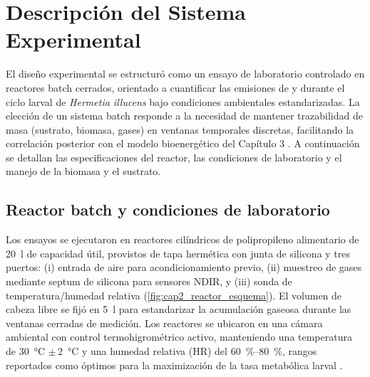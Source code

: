 
\section{Descripción del Sistema Experimental}
\label{sec:cap2_sistema_experimental}

El diseño experimental se estructuró como un ensayo de laboratorio controlado en reactores batch cerrados, orientado a cuantificar las emisiones de  y  durante el ciclo larval de \textit{Hermetia illucens} bajo condiciones ambientales estandarizadas. La elección de un sistema batch responde a la necesidad de mantener trazabilidad de masa (sustrato, biomasa, gases) en ventanas temporales discretas, facilitando la correlación posterior con el modelo bioenergético del Capítulo 3 \parencite{eriksenDynamicModellingFeed2022, padmanabhaComprehensiveDynamicGrowth2020}. A continuación se detallan las especificaciones del reactor, las condiciones de laboratorio y el manejo de la biomasa y el sustrato.

\subsection{Reactor batch y condiciones de laboratorio}
\label{subsec:cap2_reactor}

Los ensayos se ejecutaron en reactores cilíndricos de polipropileno alimentario de \SI{20}{\litre} de capacidad útil, provistos de tapa hermética con junta de silicona y tres puertos: (i) entrada de aire para acondicionamiento previo, (ii) muestreo de gases mediante septum de silicona para sensores NDIR, y (iii) sonda de temperatura/humedad relativa (\cref{fig:cap2_reactor_esquema}). El volumen de cabeza libre se fijó en \SI{5}{\litre} para estandarizar la acumulación gaseosa durante las ventanas cerradas de medición. Los reactores se ubicaron en una cámara ambiental con control termohigrométrico activo, manteniendo una temperatura de \SI{30}{\celsius} $\pm$\,\SI{2}{\celsius} y una humedad relativa (HR) del \SI{60}{\percent}--\SI{80}{\percent}, rangos reportados como óptimos para la maximización de la tasa metabólica larval \parencite{salamEffectDifferentEnvironmental2022, nayakHermetiaIllucensDiptera2023}.

